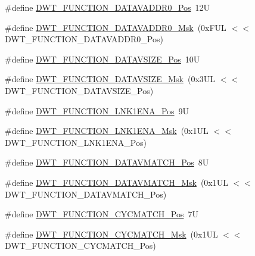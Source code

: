 \begin{DoxyCompactItemize}
\item 
\#define \hyperlink{group___c_m_s_i_s___d_w_t_ga9854cd8bf16f7dce0fb196a8029b018e}{D\-W\-T\-\_\-\-F\-U\-N\-C\-T\-I\-O\-N\-\_\-\-D\-A\-T\-A\-V\-A\-D\-D\-R0\-\_\-\-Pos}~12\-U
\item 
\#define \hyperlink{group___c_m_s_i_s___d_w_t_gafc5efbe8f9b51e04aecd00c8a4eb50fb}{D\-W\-T\-\_\-\-F\-U\-N\-C\-T\-I\-O\-N\-\_\-\-D\-A\-T\-A\-V\-A\-D\-D\-R0\-\_\-\-Msk}~(0x\-F\-U\-L $<$$<$ D\-W\-T\-\_\-\-F\-U\-N\-C\-T\-I\-O\-N\-\_\-\-D\-A\-T\-A\-V\-A\-D\-D\-R0\-\_\-\-Pos)
\item 
\#define \hyperlink{group___c_m_s_i_s___d_w_t_ga0517a186d4d448aa6416440f40fe7a4d}{D\-W\-T\-\_\-\-F\-U\-N\-C\-T\-I\-O\-N\-\_\-\-D\-A\-T\-A\-V\-S\-I\-Z\-E\-\_\-\-Pos}~10\-U
\item 
\#define \hyperlink{group___c_m_s_i_s___d_w_t_gaab42cbc1e6084c44d5de70971613ea76}{D\-W\-T\-\_\-\-F\-U\-N\-C\-T\-I\-O\-N\-\_\-\-D\-A\-T\-A\-V\-S\-I\-Z\-E\-\_\-\-Msk}~(0x3\-U\-L $<$$<$ D\-W\-T\-\_\-\-F\-U\-N\-C\-T\-I\-O\-N\-\_\-\-D\-A\-T\-A\-V\-S\-I\-Z\-E\-\_\-\-Pos)
\item 
\#define \hyperlink{group___c_m_s_i_s___d_w_t_ga89d7c48858b4d4de96cdadfac91856a1}{D\-W\-T\-\_\-\-F\-U\-N\-C\-T\-I\-O\-N\-\_\-\-L\-N\-K1\-E\-N\-A\-\_\-\-Pos}~9\-U
\item 
\#define \hyperlink{group___c_m_s_i_s___d_w_t_ga64bd419260c3337cacf93607d1ad27ac}{D\-W\-T\-\_\-\-F\-U\-N\-C\-T\-I\-O\-N\-\_\-\-L\-N\-K1\-E\-N\-A\-\_\-\-Msk}~(0x1\-U\-L $<$$<$ D\-W\-T\-\_\-\-F\-U\-N\-C\-T\-I\-O\-N\-\_\-\-L\-N\-K1\-E\-N\-A\-\_\-\-Pos)
\item 
\#define \hyperlink{group___c_m_s_i_s___d_w_t_ga106f3672cd4be7c7c846e20497ebe5a6}{D\-W\-T\-\_\-\-F\-U\-N\-C\-T\-I\-O\-N\-\_\-\-D\-A\-T\-A\-V\-M\-A\-T\-C\-H\-\_\-\-Pos}~8\-U
\item 
\#define \hyperlink{group___c_m_s_i_s___d_w_t_ga32af1f1c0fcd2d8d9afd1ad79cd9970e}{D\-W\-T\-\_\-\-F\-U\-N\-C\-T\-I\-O\-N\-\_\-\-D\-A\-T\-A\-V\-M\-A\-T\-C\-H\-\_\-\-Msk}~(0x1\-U\-L $<$$<$ D\-W\-T\-\_\-\-F\-U\-N\-C\-T\-I\-O\-N\-\_\-\-D\-A\-T\-A\-V\-M\-A\-T\-C\-H\-\_\-\-Pos)
\item 
\#define \hyperlink{group___c_m_s_i_s___d_w_t_ga4b65d79ca37ae8010b4a726312413efd}{D\-W\-T\-\_\-\-F\-U\-N\-C\-T\-I\-O\-N\-\_\-\-C\-Y\-C\-M\-A\-T\-C\-H\-\_\-\-Pos}~7\-U
\item 
\#define \hyperlink{group___c_m_s_i_s___d_w_t_ga8e2ed09bdd33a8f7f7ce0444f5f3bb25}{D\-W\-T\-\_\-\-F\-U\-N\-C\-T\-I\-O\-N\-\_\-\-C\-Y\-C\-M\-A\-T\-C\-H\-\_\-\-Msk}~(0x1\-U\-L $<$$<$ D\-W\-T\-\_\-\-F\-U\-N\-C\-T\-I\-O\-N\-\_\-\-C\-Y\-C\-M\-A\-T\-C\-H\-\_\-\-Pos)
$$
\end{DoxyCompactItemize}
